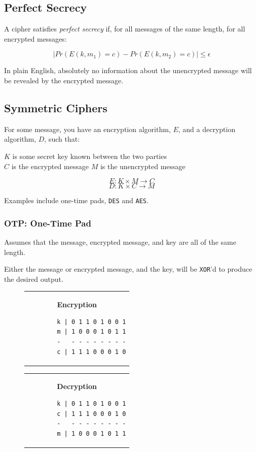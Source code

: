 \documentclass{article}
\begin{document}
\subsection{Perfect Secrecy}

A cipher satisfies \textit{perfect secrecy} if, for all messages of the same length, for all encrypted messages:

\[ | Pr(E(k, m_1) = c) - Pr(E(k, m_2) = c) | \leq \epsilon \]

In plain English, absolutely no information about the unencrypted message will be revealed by the encrypted message.

\filbreak
\subsection{Symmetric Ciphers}

For some message, you have an encryption algorithm, $E$, and a decryption algorithm, $D$, such that:
\vspace{.5cm}
\begin{center}
  $K$ is some secret key known between the two parties\\
  $C$ is the encrypted message
  $M$ is the unencrypted message
\end{center}

\[ E : K \times M \rightarrow C\]
\[ D : K \times C \rightarrow M\]

Examples include one-time pads, \texttt{DES} and \texttt{AES}.

\subsubsection{OTP: One-Time Pad}

Assumes that the message, encrypted message, and key are all of the same length.

Either the message or encrypted message, and the key, will be \texttt{XOR}'d to produce the desired output.

\begin{figure}[!htb]
  \begin{minipage}{0.5\textwidth}
    \begin{tabular}{c}
      \textbf{Encryption}
      \begin{lstlisting}
        k | 0 1 1 0 1 0 0 1
        m | 1 0 0 0 1 0 1 1
        -   - - - - - - - -
        c | 1 1 1 0 0 0 1 0
      \end{lstlisting}
    \end{tabular}
  \end{minipage}%
  \begin{minipage}{0.5\textwidth}
    \begin{tabular}{c}
      \textbf{Decryption}
      \begin{lstlisting}
        k | 0 1 1 0 1 0 0 1
        c | 1 1 1 0 0 0 1 0
        -   - - - - - - - -
        m | 1 0 0 0 1 0 1 1
      \end{lstlisting}
    \end{tabular}
  \end{minipage}%
\end{figure}
\end{document}
